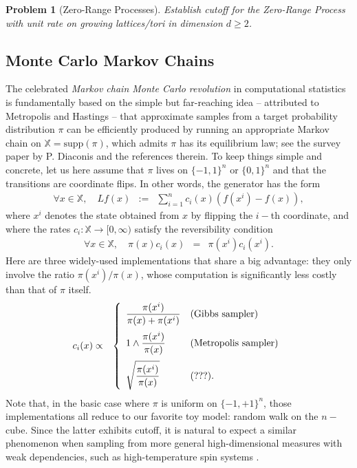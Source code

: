 \documentclass[12pt,final]{article}
\newtheorem{problem}{Problem}[section]
\numberwithin{equation}{section}
\newcommand{\supp}{\mathrm {supp}}
\newcommand{\dX}{\mathbb{X}}
\begin{document}
\begin{problem}[Zero-Range Processes]\label{pb:zrp}Establish cutoff for the Zero-Range Process with unit rate on growing lattices/tori in dimension $d\ge 2$. 
\end{problem}
\subsection{Monte Carlo Markov Chains} The celebrated \emph{Markov chain Monte Carlo revolution} in computational statistics is fundamentally based on the simple but far-reaching idea -- attributed to Metropolis \cite{doi:10.1063/1.1699114} and Hastings \cite{MR3363437} -- that approximate samples from a target probability distribution $\pi$ can be efficiently produced by running an appropriate Markov chain on $\dX=\supp(\pi)$, which admits $\pi$ has its equilibrium law; see the survey paper by P. Diaconis \cite{MR2476411} and the references therein. To keep things simple and concrete, let us here assume that $\pi$ lives on $\{-1,1\}^n$ or $\{0,1\}^n$ and that the transitions are coordinate flips. In other words, the generator has the form
\begin{eqnarray}
\label{def:Glauber}
\forall x\in\dX,\quad Lf(x) & := & \sum_{i=1}^n c_i(x)\left(f(x^i)-f(x)\right),
\end{eqnarray}
where $x^i$ denotes the state obtained from $x$ by flipping the $i-$th coordinate, and where the rates  $c_i\colon\dX\to[0,\infty)$ satisfy the reversibility condition
\begin{eqnarray*}
\forall x\in\dX,\quad \pi(x)c_i(x) & = & \pi(x^i)c_i(x^i).
\end{eqnarray*}
Here are three widely-used implementations that share a big advantage: they  only involve the ratio $\pi(x^i)/\pi(x)$, whose computation is significantly less costly than that of $\pi$ itself.
\begin{eqnarray}
\label{def:rates}
c_i(x) & \propto & \left\{
\begin{array}{ll}
\displaystyle{\frac{\pi(x^i)}{\pi(x)+\pi(x^i)}} &  (\textrm{Gibbs sampler})\medskip\\
\displaystyle{1\wedge\frac{\pi(x^i)}{\pi(x)}} & (\textrm{Metropolis sampler})\medskip\\
\displaystyle{\sqrt{\frac{\pi(x^i)}{\pi(x)}}} & (???).
\end{array}
\right.
\end{eqnarray}
Note that, in the basic case where $\pi$ is uniform on $\{-1,+1\}^n$, those implementations all reduce to our favorite toy model: random walk on the $n-$cube. Since the latter exhibits cutoff, it is  natural to expect a similar phenomenon when sampling from more general high-dimensional measures with weak dependencies, such as high-temperature spin systems \cite{MR1746301}.
\end{document}
